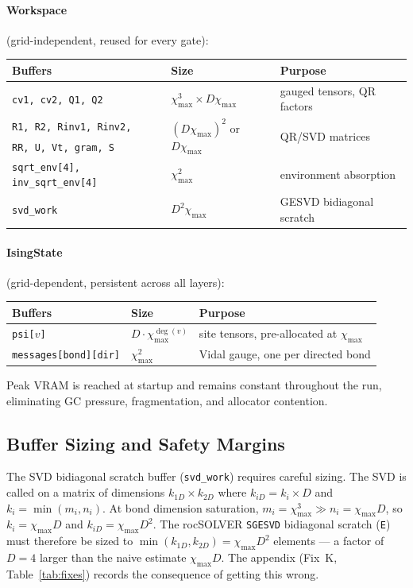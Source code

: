 \documentclass[11pt]{article}
\newcommand{\chimax}{\chi_{\mathrm{max}}}
\begin{document}
\paragraph{Workspace} (grid-independent, reused for every gate):
\begin{center}
\begin{tabular}{@{}lll@{}}
\toprule
Buffers & Size & Purpose \\
\midrule
\texttt{cv1, cv2, Q1, Q2} & $\chimax^3 \times D\chimax$ & gauged tensors, QR factors \\
\texttt{R1, R2, Rinv1, Rinv2,} & \multirow{2}{*}{$(D\chimax)^2$ or $D\chimax$} & \multirow{2}{*}{QR/SVD matrices} \\
\texttt{RR, U, Vt, gram, S} & & \\
\texttt{sqrt\_env[4], inv\_sqrt\_env[4]} & $\chimax^2$ & environment absorption \\
\texttt{svd\_work} & $D^2\chimax$ & GESVD bidiagonal scratch \\
\bottomrule
\end{tabular}
\end{center}

\paragraph{IsingState} (grid-dependent, persistent across all layers):
\begin{center}
\begin{tabular}{@{}lll@{}}
\toprule
Buffers & Size & Purpose \\
\midrule
\texttt{psi[}$v$\texttt{]} & $D \cdot \chimax^{\deg(v)}$ & site tensors, pre-allocated at $\chimax$ \\
\texttt{messages[bond][dir]} & $\chimax^2$ & Vidal gauge, one per directed bond \\
\bottomrule
\end{tabular}
\end{center}

Peak VRAM is reached at startup and remains constant throughout the run,
eliminating GC pressure, fragmentation, and allocator contention.

\subsection{Buffer Sizing and Safety Margins}

The SVD bidiagonal scratch buffer (\texttt{svd\_work}) requires careful sizing.
The SVD is called on a matrix of dimensions $k_{1D} \times k_{2D}$ where
$k_{iD} = k_i \times D$ and $k_i = \min(m_i, n_i)$. At bond dimension saturation,
$m_i = \chimax^3 \gg n_i = \chimax D$, so $k_i = \chimax D$ and
$k_{iD} = \chimax D^2$. The rocSOLVER \texttt{SGESVD} bidiagonal scratch (\texttt{E})
must therefore be sized to $\min(k_{1D}, k_{2D}) = \chimax D^2$ elements — a
factor of $D=4$ larger than the naive estimate $\chimax D$.
The appendix (Fix~K, Table~\ref{tab:fixes}) records the consequence of
getting this wrong.
\end{document}
